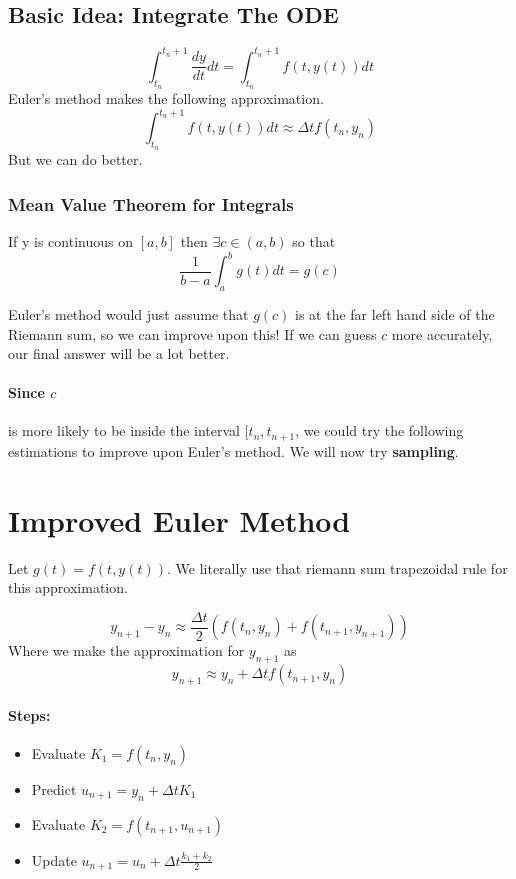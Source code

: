 \documentclass[a4paper,12pt]{report}
\begin{document}
\subsection{Basic Idea: Integrate The ODE}
$$\int_{t_n}^{t_n+1} \frac{dy}{dt} dt = \int_{t_n}^{t_n+1} f(t, y(t)) dt$$
Euler's method makes the following approximation.
$$\int_{t_n}^{t_n+1} f(t, y(t)) dt \approx \Delta t f(t_n, y_n)$$
But we can do better.

\subsubsection{Mean Value Theorem for Integrals}
If y is continuous on $[a, b]$ then $\exists c \in (a, b)$ so that 
$$\frac{1}{b-a} \int_a^b g(t) dt = g(c)$$
 
Euler's method would just assume that $g(c)$ is at the far left hand side of the 
Riemann sum, so we can improve upon this! If we can guess $c$ more accurately, 
our final answer will be a lot better.

\paragraph{Since $c$} is more likely to be inside the interval $[t_n, t_{n+1}$, we could 
try the following estimations to improve upon Euler's method. We will now try \textbf{sampling}.

\section{Improved Euler Method}
Let $g(t) = f(t, y(t))$. We literally use that riemann sum trapezoidal rule for this approximation.

$$y_{n+1}-y_n \approx \frac{\Delta t}{2}(f(t_n, y_n)+f(t_{n+1}, y_{n+1}))$$
Where we make the approximation for $y_{n+1}$ as
$$y_{n+1} \approx y_n + \Delta t f(t_{n+1}, y_n)$$

\paragraph{Steps: }
\begin{itemize}
\item Evaluate $K_1 = f(t_n, y_n)$
\item Predict $u_{n+1} = y_n + \Delta t K_1$
\item Evaluate $K_2 = f(t_{n+1}, u_{n+1})$
\item Update $u_{n+1} = u_n + \Delta t \frac{k_1+k_2}{2}$
\end{itemize}
\end{document}

